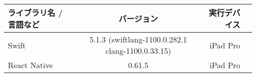 \begin{table}[htb]
    \centering
    \begin{tabular}{|l|c|r||r|} \hline 
      ライブラリ名 / 言語など & バージョン & 実行デバイス \\ \hline \hline
      Swift & 5.1.3 (swiftlang-1100.0.282.1 clang-1100.0.33.15) & iPad Pro \\ \hline
      React Native & 0.61.5 & iPad Pro  \\ \hline
    \end{tabular}
\end{table}

